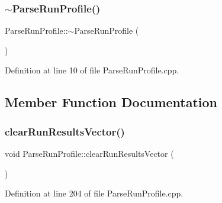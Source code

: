 \subsubsection{\texorpdfstring{$\sim$\+Parse\+Run\+Profile()}{~ParseRunProfile()}}
{\footnotesize\ttfamily Parse\+Run\+Profile\+::$\sim$\+Parse\+Run\+Profile (\begin{DoxyParamCaption}{ }\end{DoxyParamCaption})}



Definition at line 10 of file Parse\+Run\+Profile.\+cpp.



\subsection{Member Function Documentation}
\mbox{\label{class_parse_run_profile_aa00fa199f81ef8745e8e2c1e086cdf00}} 
\subsubsection{\texorpdfstring{clear\+Run\+Results\+Vector()}{clearRunResultsVector()}}
{\footnotesize\ttfamily void Parse\+Run\+Profile\+::clear\+Run\+Results\+Vector (\begin{DoxyParamCaption}{ }\end{DoxyParamCaption})}



Definition at line 204 of file Parse\+Run\+Profile.\+cpp.

